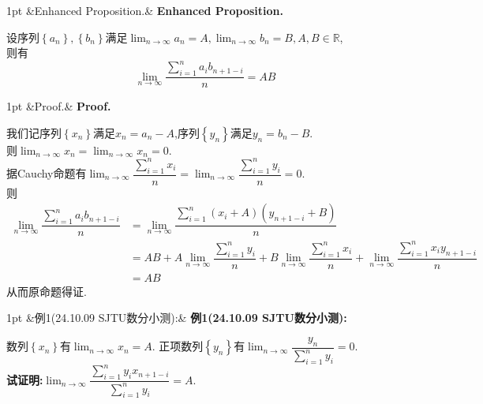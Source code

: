 \documentclass{ctexart}
\newcommand{\R}{\mathbb{R}}
\newenvironment{formal}[1][]{%
\def\FrameCommand{%
\hspace{1pt}%
{\color{DarkBlue}\vrule width 2pt}%
{\color{formalshade}\vrule width 4pt}%
\colorbox{formalshade}%
}%
\MakeFramed{\advance\hsize-\width\FrameRestore}%
\noindent\hspace{-4.55pt}%
\begin{adjustwidth}{}{1pt}%
\setlength{\parindent}{0pt}%
\vspace{3pt}%
\ifx&#1&\else %
    \textbf{#1}\par\vspace{1pt}%
\fi
}
{%
\vspace{2pt}%
\end{adjustwidth}\endMakeFramed%
}
\newenvironment{solution}[1][]{%
\def\FrameCommand{%
\hspace{1pt}%
{\color{solutionline}\vrule width 2pt}%
{\color{solutionshade}\vrule width 4pt}%
\colorbox{solutionshade}%
}%
\MakeFramed{\advance\hsize-\width\FrameRestore}%
\noindent\hspace{-4.55pt}%
\begin{adjustwidth}{}{1pt}%
\setlength{\parindent}{0pt}%
\vspace{3pt}%
\ifx&#1&\else %
    \textbf{#1}\par\vspace{1pt}%
\fi
}
{%
\vspace{2pt}%
\end{adjustwidth}\endMakeFramed%
}
\newenvironment{problem}[1][]{%
\def\FrameCommand{%
\hspace{1pt}%
{\color{problemline}\vrule width 2pt}%
{\color{problemshade}\vrule width 4pt}%
\colorbox{problemshade}%
}%
\MakeFramed{\advance\hsize-\width\FrameRestore}%
\noindent\hspace{-4.55pt}%
\begin{adjustwidth}{}{1pt}%
\setlength{\parindent}{0pt}%
\vspace{3pt}%
\ifx&#1&\else %
    \textbf{#1}\par\vspace{1pt}%
\fi
}
{%
\vspace{2pt}%
\end{adjustwidth}\endMakeFramed%
}
\begin{document}
\begin{formal}[Enhanced Proposition.]
    设序列$\left\{a_n\right\},\left\{b_n\right\}$满足$\displaystyle\lim_{n\to\infty}{a_n}=A,\lim_{n\to\infty}{b_n}=B,A,B\in\R$,\\
    则有$$\lim_{n\to\infty}{\dfrac{\sum_{i=1}^{n}{a_ib_{n+1-i}}}{n}}=AB$$
\end{formal}
\begin{solution}[Proof.]
    我们记序列$\left\{x_n\right\}$满足$x_n=a_n-A$,序列$\left\{y_n\right\}$满足$y_n=b_n-B$.\\
    则$\displaystyle\lim_{n\to\infty}{x_n}=\lim_{n\to\infty}{x_n}=0$.\\
    据Cauchy命题有$\displaystyle\lim_{n\to\infty}{\dfrac{\sum_{i=1}^{n}{x_i}}{n}}=\lim_{n\to\infty}{\dfrac{\sum_{i=1}^{n}{y_i}}{n}}=0$.\\
    则\begin{align*}
        \lim_{n\to\infty}{\dfrac{\sum_{i=1}^{n}{a_ib_{n+1-i}}}{n}}
        &= \lim_{n\to\infty}{\dfrac{\sum_{i=1}^{n}{(x_i+A)(y_{n+1-i}+B)}}{n}} \\
        &= AB+A\lim_{n\to\infty}{\dfrac{\sum_{i=1}^{n}{y_i}}{n}}+B\lim_{n\to\infty}{\dfrac{\sum_{i=1}^{n}{x_i}}{n}}+\lim_{n\to\infty}{\dfrac{\sum_{i=1}^{n}{x_iy_{n+1-i}}}{n}} \\
        &= AB
    \end{align*}
    从而原命题得证.
\end{solution}
\begin{problem}[例1(24.10.09 SJTU数分小测):]
    数列$\left\{ x_n\right\}$有$\displaystyle\lim_{n\to\infty}{x_n}=A$.
    正项数列$\left\{ y_n\right\}$有$\displaystyle\lim_{n\to\infty}\dfrac{y_n}{\sum_{i=1}^{n}{y_i}}=0$.\\
    \textbf{试证明:}$\displaystyle\lim_{n\to\infty}{\dfrac{\sum_{i=1}^{n}{y_ix_{n+1-i}}}{\sum_{i=1}^{n}{y_i}}}=A.$\\
\end{problem}\noindent
\end{document}

